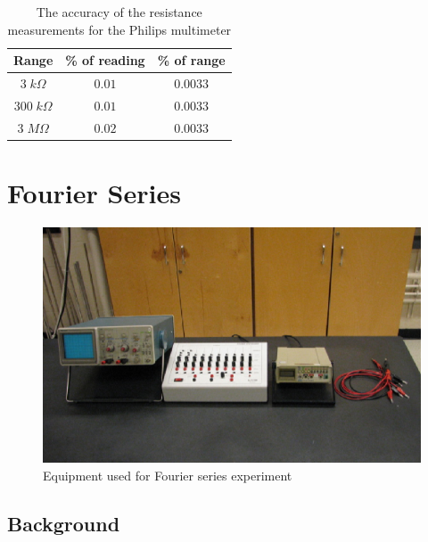 \begin{table}[H]
    \centering
    \caption{The accuracy of the resistance measurements for the Philips multimeter}
    \begin{tabular}{|c|c|c|}
        \hline
        Range & \% of reading & \% of range \\ \hline \hline
        $3\;k\Omega$ & $0.01$ & $0.0033$ \\ 
        $ 300\;k\Omega$ & $0.01$ & $0.0033$ \\
        $ 3\;M\Omega$ & $0.02$ & $0.0033$ \\ \hline
    \end{tabular}
    \label{tab:DC2}
\end{table}




\chapter{Fourier Series}

\begin{figure}[H]
    \centering
    \includegraphics[scale = 0.8]{Images/FS1.PNG}
    \caption{Equipment used for Fourier series experiment}
    \label{fig:FS1}
\end{figure}

\section{Background}

